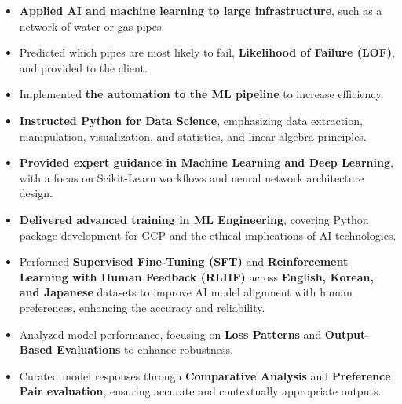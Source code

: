 \documentclass[10pt,a4paper,ragged2e,withhyper]{altacv}
\begin{document}

\begin{itemize}
\item {\bf Applied AI and machine learning to large infrastructure}, such as a network of water or gas pipes.
\item Predicted which pipes are most likely to fail, {\bf Likelihood of Failure (LOF)}, and provided to the client.
\item Implemented {\bf the automation to the ML pipeline} to increase efficiency.
\end{itemize}
\divider

\begin{itemize}
\item {\bf Instructed Python for Data Science}, emphasizing data extraction, manipulation, visualization, and statistics, and linear algebra principles.
\item {\bf Provided expert guidance in Machine Learning and Deep Learning}, with a focus on Scikit-Learn workflows and neural network architecture design.
\item {\bf Delivered advanced training in ML Engineering}, covering Python package development for GCP and the ethical implications of AI technologies.
\end{itemize}
\divider


\begin{itemize}
\item Performed {\bf Supervised Fine-Tuning (SFT)} and {\bf Reinforcement Learning with Human Feedback (RLHF)} across {\bf English, Korean, and Japanese} datasets to improve AI model alignment with human preferences, enhancing the accuracy and reliability.
\item Analyzed model performance, focusing on {\bf Loss Patterns} and {\bf Output-Based Evaluations} to enhance robustness. 
\item Curated model responses through {\bf Comparative Analysis} and {\bf Preference Pair evaluation}, ensuring accurate and contextually appropriate outputs.
\end{itemize}
\divider
\end{document}
